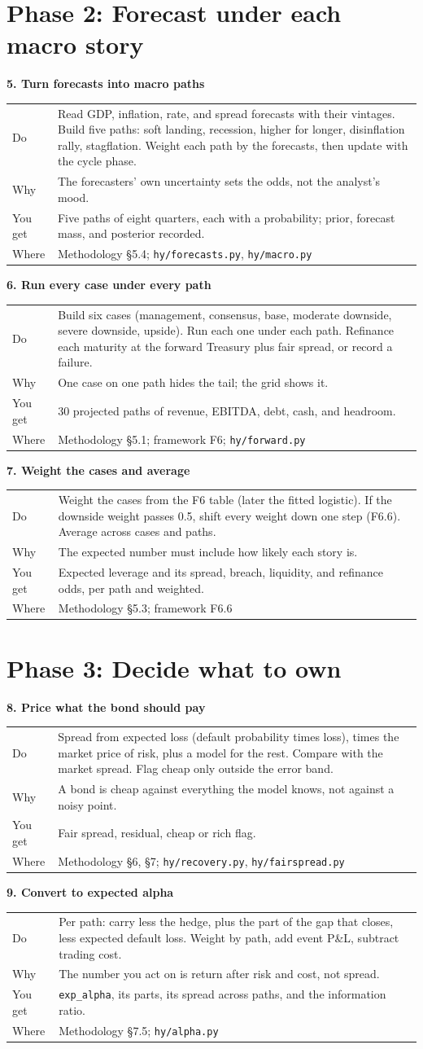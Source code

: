 \documentclass[11pt,a4paper]{article}
\makeatletter
\newcommand{\code}[1]{\texttt{\small #1}}
\newcommand{\step}[5]{%
\par\medskip\noindent\textbf{#1}\par
\noindent\begin{tabularx}{\linewidth}{@{}lX@{}}
Do & #2\\
Why & #3\\
You get & #4\\
Where & #5\\
\end{tabularx}}
\makeatother
\begin{document}
\section*{\textcolor{ph2}{Phase 2: Forecast under each macro story}}

\step{5. Turn forecasts into macro paths}
{Read GDP, inflation, rate, and spread forecasts with their vintages. Build five paths: soft landing, recession, higher for longer, disinflation rally, stagflation. Weight each path by the forecasts, then update with the cycle phase.}
{The forecasters' own uncertainty sets the odds, not the analyst's mood.}
{Five paths of eight quarters, each with a probability; prior, forecast mass, and posterior recorded.}
{Methodology \S5.4; \code{hy/forecasts.py}, \code{hy/macro.py}}

\step{6. Run every case under every path}
{Build six cases (management, consensus, base, moderate downside, severe downside, upside). Run each one under each path. Refinance each maturity at the forward Treasury plus fair spread, or record a failure.}
{One case on one path hides the tail; the grid shows it.}
{30 projected paths of revenue, EBITDA, debt, cash, and headroom.}
{Methodology \S5.1; framework F6; \code{hy/forward.py}}

\step{7. Weight the cases and average}
{Weight the cases from the F6 table (later the fitted logistic). If the downside weight passes 0.5, shift every weight down one step (F6.6). Average across cases and paths.}
{The expected number must include how likely each story is.}
{Expected leverage and its spread, breach, liquidity, and refinance odds, per path and weighted.}
{Methodology \S5.3; framework F6.6}

\section*{\textcolor{ph3}{Phase 3: Decide what to own}}

\step{8. Price what the bond should pay}
{Spread from expected loss (default probability times loss), times the market price of risk, plus a model for the rest. Compare with the market spread. Flag cheap only outside the error band.}
{A bond is cheap against everything the model knows, not against a noisy point.}
{Fair spread, residual, cheap or rich flag.}
{Methodology \S6, \S7; \code{hy/recovery.py}, \code{hy/fairspread.py}}

\step{9. Convert to expected alpha}
{Per path: carry less the hedge, plus the part of the gap that closes, less expected default loss. Weight by path, add event P\&L, subtract trading cost.}
{The number you act on is return after risk and cost, not spread.}
{\code{exp\_alpha}, its parts, its spread across paths, and the information ratio.}
{Methodology \S7.5; \code{hy/alpha.py}}
\end{document}
